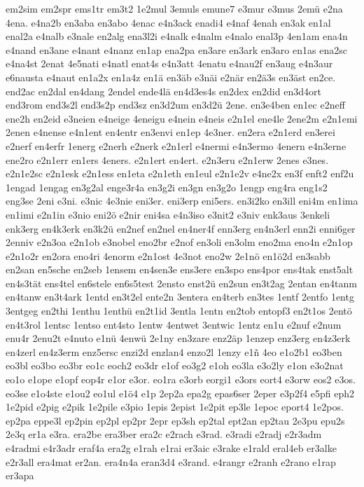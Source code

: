 {em2sim
em2spr
ems1tr
em3t2
1e2mul
3emuls
emune7
e3mur
e3mus
2emü
e2na
4ena.
e4na2b
en3aba
en3abo
4enac
e4n3ack
enadi4
e4naf
4enah
en3ak
en1al
enal2a
e4nalb
e3nale
en2alg
ena3l2i
e4nalk
e4nalm
e4nalo
enal3p
4en1am
ena4n
e4nand
en3ane
e4nant
e4nanz
en1ap
ena2pa
en3are
en3ark
en3aro
en1as
ena2sc
e4na4st
2enat
4e5nati
e4natl
enat4s
e4n3att
4enatu
e4nau2f
en3aug
e4n3aur
e6nausta
e4naut
en1a2x
en1a4z
en1ä
en3äb
e3näi
e2när
en2ä3s
en3äst
en2ce.
end2ac
en2dal
en4dang
2endel
ende4lä
en4d3es4s
en2dex
en2did
en3d4ort
end3rom
end3s2l
end3s2p
end3sz
en3d2um
en3d2ü
2ene.
en3e4ben
en1ec
e2neff
ene2h
en2eid
e3neien
e4neige
4eneigu
e4nein
e4neis
e2n1el
ene4le
2ene2m
e2n1emi
2enen
e4nense
e4n1ent
en4entr
en3envi
en1ep
4e3ner.
en2era
e2n1erd
en3erei
e2nerf
en4erfr
1energ
e2nerh
e2nerk
e2n1erl
e4nermi
e4n3ermo
4enern
e4n3erne
ene2ro
e2n1err
en1ers
4eners.
e2n1ert
en4ert.
e2n3eru
e2n1erw
2enes
e3nes.
e2n1e2sc
e2n1esk
e2n1ess
en1eta
e2n1eth
en1eul
e2n1e2v
e4ne2x
en3f
enft2
enf2u
1engad
1engag
en3g2al
enge3r4a
en3g2i
en3gn
en3g2o
1engp
eng4ra
eng1s2
eng3se
2eni
e3ni.
e3nic
4e3nie
eni3er.
eni3erp
eni5ers.
en3i2ko
en3ill
eni4m
en1ima
en1imi
e2n1in
e3nio
eni2ö
e2nir
eni4sa
e4n3iso
e3nit2
e3niv
enk3aus
3enkeli
enk3erg
en4k3erk
en3k2ü
en2nef
en2nel
en4ner4f
enn3erg
en4n3erl
enn2i
enni6ger
2enniv
e2n3oa
e2n1ob
e3nobel
eno2br
e2nof
en3oli
en3olm
eno2ma
eno4n
e2n1op
e2n1o2r
en2ora
eno4ri
4enorm
e2n1ost
4e3not
eno2w
2e1nö
en1ö2d
en3sabb
en2san
en5sche
en2seb
1ensem
en4sen3e
ens3ere
en3spo
ens4por
ens4tak
enst5alt
en4s3tät
ens4tel
en6stele
en6s5test
2ensto
enst2ü
en2sun
en3t2ag
2entan
en4tanm
en4tanw
en3t4ark
1entd
en3t2el
ente2n
3entera
en4terb
en3tes
1entf
2entfo
1entg
3entgeg
en2thi
1enthu
1enthü
en2t1id
3entla
1entn
en2tob
entopf3
en2t1os
2entö
en4t3rol
1entsc
1entso
ent4sto
1entw
4entwet
3entwic
1entz
en1u
e2nuf
e2num
enu4r
2enu2t
e4nuto
e1nü
4enwü
2e1ny
en3zare
enz2äp
1enzep
enz3erg
en4z3erk
en4zerl
en4z3erm
enz5ersc
enzi2d
enzlan4
enzo2l
1enzy
e1ñ
4eo
e1o2b1
eo3ben
eo3bl
eo3bo
eo3br
eo1c
eoch2
eo3dr
e1of
eo3g2
e1oh
eo3la
e3o2ly
e1on
e3o2nat
eo1o
e1ope
e1opf
eop4r
e1or
e3or.
eo1ra
e3orb
eorgi1
e3ors
eort4
e3orw
eos2
e3os.
eo3se
e1o4ste
e1ou2
eo1ul
e1ö4
e1p
2ep2a
epa2g
epas6ser
2eper
e3p2f4
e5pfi
eph2
1e2pid
e2pig
e2pik
1e2pile
e3pio
1epis
2epist
1e2pit
ep3le
1epoc
eport4
1e2pos.
ep2pa
eppe3l
ep2pin
ep2pl
ep2pr
2epr
ep3sh
ep2tal
ept2an
ep2tau
2e3pu
epu2s
2e3q
er1a
e3ra.
era2be
era3ber
era2c
e2rach
e3rad.
e3radi
e2radj
e2r3adm
e4radmi
e4r3adr
eraf4a
era2g
e1rah
e1rai
er3aic
e3rake
e1rald
eral4eb
er3alke
e2r3all
era4mat
er2an.
era4n4a
eran3d4
e3rand.
e4rangr
e2ranh
e2rano
e1rap
er3apa
}
